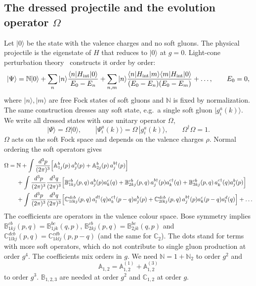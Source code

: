 \documentclass[aps,prd,onecolumn,superscriptaddress,nofootinbib,floatfix,longbibliography,11pt]{revtex4-2}
\numberwithin{equation}{section}
\def\mf#1{\mathbb{#1}}
\begin{document}
\subsection{The dressed projectile and the evolution operator \texorpdfstring{$\Omega$}{Omega}}\label{sec:Omega}

Let $|0\rangle$ be the state with the valence charges and no soft gluons. The physical projectile is the eigenstate of $H$ that reduces to $|0\rangle$ at $g=0$. Light-cone perturbation theory~\cite{Lepage:1980fj,Brodsky:1997de} constructs it order by order:
\begin{equation}
|\Psi\rangle=\mf N|0\rangle+\sum_n|n\rangle\frac{\langle n|H_{\rm int}|0\rangle}{E_0-E_n}+\sum_{n,m}|n\rangle\frac{\langle n|H_{\rm int}|m\rangle\langle m|H_{\rm int}|0\rangle}{(E_0-E_n)(E_0-E_m)}+\dots,\qquad E_0=0,
\label{eq:LCPT}
\end{equation}
where $|n\rangle,|m\rangle$ are free Fock states of soft gluons and $\mf N$ is fixed by normalization. The same construction dresses any soft state, e.g.\ a single soft gluon $|g^a_i(k)\rangle$. We write all dressed states with one unitary operator $\Omega$,
\begin{equation}
|\Psi\rangle=\Omega|0\rangle,\qquad |\Psi^a_i(k)\rangle=\Omega\,|g^a_i(k)\rangle,\qquad \Omega^\dagger\Omega=1.
\label{eq:Omegadef}
\end{equation}
$\Omega$ acts on the soft Fock space and depends on the valence charges $\rho$. Normal ordering the soft operators gives~\cite{Lublinsky:2016meo}
\begin{align}
\Omega={}&\mf N+\int\frac{d^3p}{(2\pi)^3}\Big[\mf A^b_{1j}(p)\,a^b_j(p)+\mf A^b_{2j}(p)\,a^{b\dagger}_j(p)\Big]\notag\\
&+\int\frac{d^3p}{(2\pi)^3}\frac{d^3q}{(2\pi)^3}\Big[\mf B^{cb}_{1kj}(p,q)\,a^b_j(p)a^c_k(q)+\mf B^{cb}_{2kj}(p,q)\,a^{b\dagger}_j(p)a^{c\dagger}_k(q)+\mf B^{cb}_{3kj}(p,q)\,a^{c\dagger}_k(q)a^b_j(p)\Big]\notag\\
&+\int\frac{d^3p}{(2\pi)^3}\frac{d^3q}{(2\pi)^3}\Big[\mf C^{dcb}_{1lkj}(p,q)\,a^{d\dagger}_l(q)a^{c\dagger}_k(p-q)a^b_j(p)+\mf C^{dcb}_{2lkj}(p,q)\,a^{b\dagger}_j(p)a^c_k(p-q)a^d_l(q)\Big]+\dots
\label{eq:OmegaExp}
\end{align}
The coefficients are operators in the valence colour space. Bose symmetry implies $\mf B^{cb}_{1kj}(p,q)=\mf B^{bc}_{1jk}(q,p)$, $\mf B^{cb}_{2kj}(p,q)=\mf B^{bc}_{2jk}(q,p)$ and $\mf C^{dcb}_{1lkj}(p,q)=\mf C^{cdb}_{1klj}(p,p-q)$ (and the same for $\mf C_2$). The dots stand for terms with more soft operators, which do not contribute to single gluon production at order $g^4$. The coefficients mix orders in $g$. We need $\mf N=1+\mf N_2$ to order $g^2$ and
\begin{equation}
\mf A_{1,2}=\mf A^{(1)}_{1,2}+\mf A^{(3)}_{1,2}
\end{equation}
to order $g^3$. $\mf B_{1,2,3}$ are needed at order $g^2$ and $\mf C_{1,2}$ at order $g$.
\end{document}
